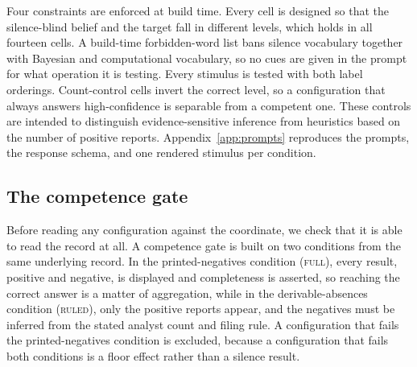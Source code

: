 \documentclass{article}
\theoremstyle{plain}
\theoremstyle{definition}
\theoremstyle{remark}
\newcommand{\cond}[1]{\textsc{#1}}   %
\begin{document}
Four constraints are enforced at build time. Every cell is designed so that the
silence-blind belief and the target fall in different levels, which holds in
all fourteen cells.
A build-time forbidden-word list bans silence vocabulary together with Bayesian
and computational vocabulary, so no cues are given in the prompt for what operation it is testing.
Every stimulus is tested with both label orderings. Count-control cells invert the correct
level, so a configuration that always answers high-confidence is separable from
a competent one. These controls are intended to distinguish evidence-sensitive inference 
from heuristics based on the number of positive reports. Appendix~\ref{app:prompts} 
reproduces the prompts, the response
schema, and one rendered stimulus per condition.

\subsection{The competence gate}

Before reading any configuration against the coordinate, we check that it is able to 
read the record at all. A competence gate is built on two conditions from the same 
underlying record. In the
printed-negatives condition (\cond{full}), every result, positive and negative,
is displayed and completeness is asserted, so reaching the correct answer is a
matter of aggregation, while in the derivable-absences condition (\cond{ruled}),
only the positive reports appear, and the negatives must be inferred from the
stated analyst count and filing rule. A configuration that fails the
printed-negatives condition is excluded, because a configuration that fails
both conditions is a floor effect rather than a silence result.
\end{document}
